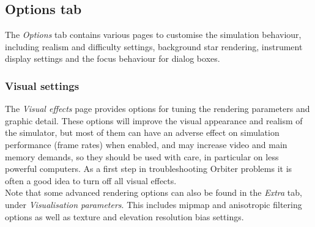 \documentclass[Orbiter User Manual.tex]{subfiles}
\begin{document}
\subsection{Options tab}
\label{ssec:options_tab}
The \textit{Options} tab contains various pages to customise the simulation behaviour, including realism and difficulty settings, background star rendering, instrument display settings and the focus behaviour for dialog boxes.

\begin{figure}[H]
	\centering
\end{figure}

\subsubsection{Visual settings}
The \textit{Visual effects} page provides options for tuning the rendering parameters and graphic detail. These options will improve the visual appearance and realism of the simulator, but most of them can have an adverse effect on simulation performance (frame rates) when enabled, and may increase video and main memory demands, so they should be used with care, in particular on less powerful computers. As a first step in troubleshooting Orbiter problems it is often a good idea to turn off all visual effects.\\
Note that some advanced rendering options can also be found in the \textit{Extra} tab, under \textit{Visualisation parameters}. This includes mip­map and anisotropic filtering options as well as texture and elevation resolution bias settings.

\end{document}
